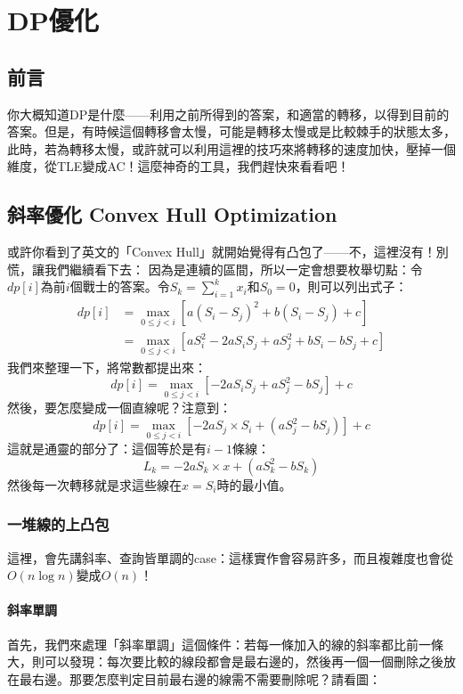 \documentclass[main.tex]{subfiles}
\begin{document}
\chapter{DP優化}
	\section{前言}
		你大概知道DP是什麼——利用之前所得到的答案，和適當的轉移，以得到目前的答案。但是，有時候這個轉移會太慢，可能是轉移太慢或是比較棘手的狀態太多，此時，若為轉移太慢，或許就可以利用這裡的技巧來將轉移的速度加快，壓掉一個維度，從TLE變成AC！這麼神奇的工具，我們趕快來看看吧！
	\section{斜率優化 Convex Hull Optimization}
		或許你看到了英文的「Convex Hull」就開始覺得有凸包了——不，這裡沒有！別慌，讓我們繼續看下去：
		因為是連續的區間，所以一定會想要枚舉切點：令$dp[i]$為前$i$個戰士的答案。令$S_k = \sum^{k}_{i =1 } x_i$和$S_0 = 0$，則可以列出式子：
		\begin{align*}
			dp[i] &= \max_{0 \leq j < i}[a(S_i - S_{j})^2 + b(S_i - S_{j}) + c]\\
			&= \max_{0 \leq j < i}[aS_i^2 - 2aS_iS_j  + aS_j^2 + bS_i - bS_j + c]
		\end{align*}
		我們來整理一下，將常數都提出來：
		$$dp[i] = \max_{0 \leq j < i}[ - 2aS_iS_j  + aS_j^2  - bS_j] + c$$
		然後，要怎麼變成一個直線呢？注意到：
		$$dp[i] = \max_{0 \leq j < i}[ - 2aS_j \times S_i  + (aS_j^2  - bS_j)] + c$$
		這就是通靈的部分了：這個等於是有$i - 1$條線：
		$$L_k = -2aS_k\times x + (aS_k^2 - bS_k)$$
		然後每一次轉移就是求這些線在$x = S_i$時的最小值。
	\subsection{一堆線的上凸包}
		這裡，會先講斜率、查詢皆單調的case：這樣實作會容易許多，而且複雜度也會從$O(n \log n)$變成$O(n)$！
		\subsubsection{斜率單調}
			首先，我們來處理「斜率單調」這個條件：若每一條加入的線的斜率都比前一條大，則可以發現：每次要比較的線段都會是最右邊的，然後再一個一個刪除之後放在最右邊。那要怎麼判定目前最右邊的線需不需要刪除呢？請看圖：
			
\end{document}
